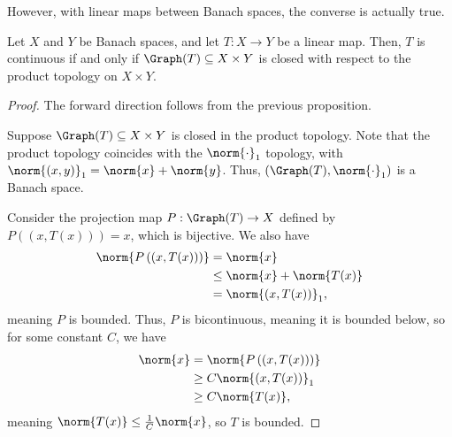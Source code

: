 \documentclass[10pt]{mypackage}
\begin{document}
  However, with linear maps between Banach spaces, the converse is actually true.
  \begin{theorem}
    Let $X$ and $Y$ be Banach spaces, and let $T: X\rightarrow Y$ be a linear map. Then, $T$ is continuous if and only if $\Graph(T) \subseteq X\times Y$ is closed with respect to the product topology on $X\times Y$.
  \end{theorem}
  \begin{proof}
    The forward direction follows from the previous proposition.\newline

    Suppose $\Graph(T)\subseteq X\times Y$ is closed in the product topology. Note that the product topology coincides with the $\norm{\cdot}_1$ topology, with $\norm{\left(x,y\right)}_{1} = \norm{x} + \norm{y}$. Thus, $\left(\Graph(T),\norm{\cdot}_1\right)$ is a Banach space.\newline

    Consider the projection map $P: \Graph(T) \rightarrow X$ defined by $P\left(\left(x,T(x)\right)\right) = x$, which is bijective. We also have
    \begin{align*}
      \norm{P\left(\left(x,T(x)\right)\right)} &= \norm{x}\\
                                               &\leq \norm{x} + \norm{T(x)}\\
                                               &= \norm{\left(x,T(x)\right)}_{1},
    \end{align*}
    meaning $P$ is bounded. Thus, $P$ is bicontinuous, meaning it is bounded below, so for some constant $C$, we have
    \begin{align*}
      \norm{x} &= \norm{P\left(\left(x,T(x)\right)\right)}\\
               &\geq C\norm{\left(x,T(x)\right)}_{1}\\
               &\geq C\norm{T(x)},
    \end{align*}
    meaning $\norm{T(x)}\leq \frac{1}{C}\norm{x}$, so $T$ is bounded.
  \end{proof}
\end{document}
